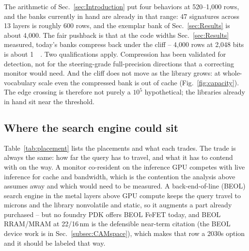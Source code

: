 \documentclass[conference]{IEEEtran}
\newcommand{\fefet}{{FeFET}\xspace}
\begin{document}
The arithmetic of Sec.~\ref{sec:Introduction} put four behaviors at
520--1{,}000 rows, and the banks currently in hand are already in that
range: 47 signatures across 13 layers is roughly 600 rows, and the
exemplar bank of Sec.~\ref{sec:Results} is about 4{,}000. The fair
pushback is that at the code widths Sec.~\ref{sec:Results} measured,
today's banks compress back under the cliff -- 4{,}000 rows at 2{,}048
bits is about \qty{1}{\mega\byte}. Two qualifications apply. Compression has been validated for detection, not for the
steering-grade full-precision directions that a correcting monitor would
need. And the cliff does not move as the library grows: at
whole-vocabulary scale even the compressed bank is out of cache
(Fig.~\ref{fig:capacity}). The edge crossing is therefore not purely a
$10^{5}$ hypothetical; the libraries already in hand sit near the
threshold.

\subsection{Where the search engine could sit}
\label{subsec:Placement}
Table~\ref{tab:placement} lists the placements and what each trades. The
trade is always the same: how far the query has to travel, and what it
has to contend with on the way. A monitor co-resident on the inference
GPU competes with live inference for cache and bandwidth, which is the
contention the analysis above assumes away and which would need to be
measured. A back-end-of-line (BEOL) search engine in the metal layers
above GPU compute keeps the query travel to microns and the library
nonvolatile and static, so it augments a part already purchased -- but no
foundry PDK offers BEOL \fefet today, and BEOL RRAM/MRAM at 22/16\,nm is
the defensible near-term citation
(the BEOL device work is in Sec.~\ref{subsec:CAMspace}), which makes
that row a 2030s option and it should be labeled that way.
\end{document}
